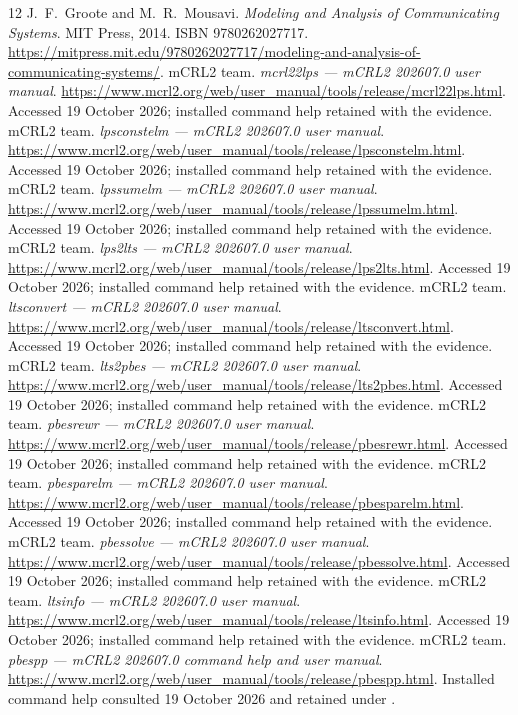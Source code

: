 \documentclass[11pt,a4paper]{article}
\begin{document}
\begin{thebibliography}{12}
 J.~F.~Groote and M.~R.~Mousavi. \emph{Modeling and Analysis of Communicating Systems}. MIT Press, 2014. ISBN 9780262027717. \url{https://mitpress.mit.edu/9780262027717/modeling-and-analysis-of-communicating-systems/}.
 mCRL2 team. \emph{mcrl22lps --- mCRL2 202607.0 user manual}. \url{https://www.mcrl2.org/web/user_manual/tools/release/mcrl22lps.html}. Accessed 19 October 2026; installed command help retained with the evidence.
 mCRL2 team. \emph{lpsconstelm --- mCRL2 202607.0 user manual}. \url{https://www.mcrl2.org/web/user_manual/tools/release/lpsconstelm.html}. Accessed 19 October 2026; installed command help retained with the evidence.
 mCRL2 team. \emph{lpssumelm --- mCRL2 202607.0 user manual}. \url{https://www.mcrl2.org/web/user_manual/tools/release/lpssumelm.html}. Accessed 19 October 2026; installed command help retained with the evidence.
 mCRL2 team. \emph{lps2lts --- mCRL2 202607.0 user manual}. \url{https://www.mcrl2.org/web/user_manual/tools/release/lps2lts.html}. Accessed 19 October 2026; installed command help retained with the evidence.
 mCRL2 team. \emph{ltsconvert --- mCRL2 202607.0 user manual}. \url{https://www.mcrl2.org/web/user_manual/tools/release/ltsconvert.html}. Accessed 19 October 2026; installed command help retained with the evidence.
 mCRL2 team. \emph{lts2pbes --- mCRL2 202607.0 user manual}. \url{https://www.mcrl2.org/web/user_manual/tools/release/lts2pbes.html}. Accessed 19 October 2026; installed command help retained with the evidence.
 mCRL2 team. \emph{pbesrewr --- mCRL2 202607.0 user manual}. \url{https://www.mcrl2.org/web/user_manual/tools/release/pbesrewr.html}. Accessed 19 October 2026; installed command help retained with the evidence.
 mCRL2 team. \emph{pbesparelm --- mCRL2 202607.0 user manual}. \url{https://www.mcrl2.org/web/user_manual/tools/release/pbesparelm.html}. Accessed 19 October 2026; installed command help retained with the evidence.
 mCRL2 team. \emph{pbessolve --- mCRL2 202607.0 user manual}. \url{https://www.mcrl2.org/web/user_manual/tools/release/pbessolve.html}. Accessed 19 October 2026; installed command help retained with the evidence.
 mCRL2 team. \emph{ltsinfo --- mCRL2 202607.0 user manual}. \url{https://www.mcrl2.org/web/user_manual/tools/release/ltsinfo.html}. Accessed 19 October 2026; installed command help retained with the evidence.
 mCRL2 team. \emph{pbespp --- mCRL2 202607.0 command help and user manual}. \url{https://www.mcrl2.org/web/user_manual/tools/release/pbespp.html}. Installed command help consulted 19 October 2026 and retained under .
\end{thebibliography}
\end{document}
